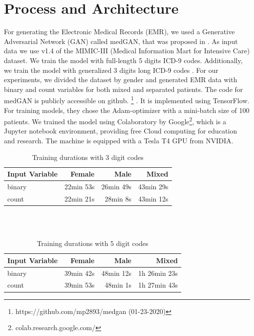 \documentclass[11pt, a4paper, oneside]{book}
\begin{document}
\section{Process and Architecture}
For generating the Electronic Medical Records (EMR), we used a Generative Adversarial Network (GAN) called medGAN, that was proposed in \citep{Choi2017}. As input data we use v1.4 of the MIMIC-III (Medical Information Mart for Intensive Care) dataset. We train the model with full-length 5 digits ICD-9 codes. Additionally, we train the model with generalized 3 digits long ICD-9 codes . For our experiments, we divided the dataset by gender and generated EMR data with binary and count variables for both mixed and separated patients. The code for medGAN is publicly accessible on github. \footnote{https://github.com/mp2893/medgan (01-23-2020)} . It is implemented using TensorFlow.
For training models, they chose the Adam-optimizer with a mini-batch size of 100 patients. \citep{Choi2017} We trained the model using Colaboratory by Google\footnote{colab.research.google.com/}, which is a Jupyter notebook environment, providing free Cloud computing for education and research.
The machine is equipped with a Tesla T4 GPU from NVIDIA.

\begin{table}
\begin{center}
\begin{tabularx}{\textwidth}{X|r|r|r}
Input Variable & Female & Male & Mixed \\
\hline
binary & 22min 53s & 26min 49s & 43min 29s\\
count & 22min 21s & 28min 8s & 43min 12s\\
\end{tabularx}
\caption{Training durations with 3 digit codes}
\end{center}
\end{table}
\\
\\
\begin{table}
\begin{center}
\begin{tabularx}{\textwidth}{X|r|r|r}
Input Variable & Female & Male & Mixed \\
\hline
binary & 39min 42s & 48min 12s & 1h 26min 23s\\
count & 39min 53s & 48min 1s & 1h 27min 43s\\
\end{tabularx}
\caption{Training durations with 5 digit codes}
\end{center}
\end{table}
\end{document}
